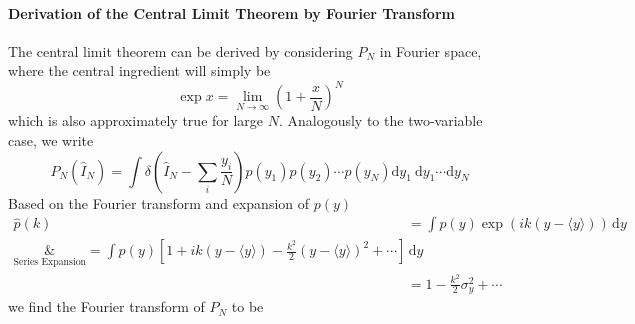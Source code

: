\paragraph{Derivation of the Central Limit Theorem by Fourier Transform} The central limit
theorem can be derived by considering $P_N$ in Fourier space, where 
the central ingredient will simply be
\begin{equation}
    \exp{x} = \lim_{N \rightarrow \infty} \left(1 + \frac{x}{N}\right)^N
\end{equation}
which is also approximately true for large $N$.
Analogously to the two-variable case, we write
\begin{equation}
    P_N\left(\hat{I}_N\right)=\int \delta\left(\hat{I}_N-\sum_i \frac{y_i}{N}\right) p\left(y_1\right) p\left(y_2\right) \cdots p\left(y_N\right) \mathrm{d} y_1 \mathrm{~d} y_1 \cdots \mathrm{d} y_N
\end{equation}
Based on the Fourier transform and expansion of $p(y)$
\begin{equation}
    \begin{aligned}
        \hat{p}(k)&=\int p(y) \exp{\left(i k(y-\langle y\rangle)\right)} \, \mathrm{d} y \\
        \underset{\text{Series Expansion}}&= \int p(y) \left[ 1 + ik(y-\langle y\rangle) - \frac{k^2}{2}(y-\langle y\rangle)^2 + \cdots \right] \, \mathrm{d} y \\
        &= 1 - \frac{k^2}{2} \sigma_y^2 + \cdots
    \end{aligned}
\end{equation}
we find the Fourier transform of $P_N$ to be
